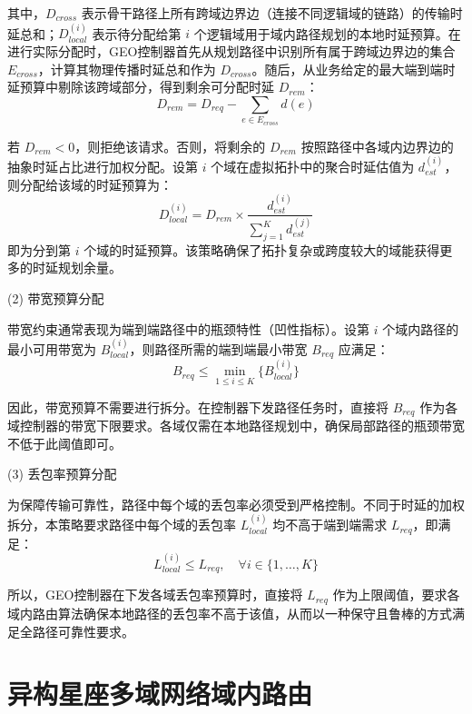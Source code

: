 \documentclass[print, master, vlined]{DissertUESTC}
\begin{document}
    其中，$D_{cross}$ 表示骨干路径上所有跨域边界边（连接不同逻辑域的链路）的传输时延总和；$D_{local}^{(i)}$ 表示待分配给第 $i$ 个逻辑域用于域内路径规划的本地时延预算。在进行实际分配时，GEO控制器首先从规划路径中识别所有属于跨域边界边的集合 $E_{cross}$，计算其物理传播时延总和作为 $D_{cross}$。随后，从业务给定的最大端到端时延预算中剔除该跨域部分，得到剩余可分配时延 $D_{rem}$：
    \begin{equation}
        D_{rem} = D_{req} - \sum_{e \in E_{cross}} d(e)
    \end{equation}
    
    若 $D_{rem} < 0$，则拒绝该请求。否则，将剩余的 $D_{rem}$ 按照路径中各域内边界边的抽象时延占比进行加权分配。设第 $i$ 个域在虚拟拓扑中的聚合时延估值为 $d_{est}^{(i)}$，则分配给该域的时延预算为：
    \begin{equation}
        D_{local}^{(i)} = D_{rem} \times \frac{d_{est}^{(i)}}{\sum_{j=1}^{K} d_{est}^{(j)}}
    \end{equation}
    即为分到第 $i$ 个域的时延预算。该策略确保了拓扑复杂或跨度较大的域能获得更多的时延规划余量。
    
    (2) 带宽预算分配
    
    带宽约束通常表现为端到端路径中的瓶颈特性（凹性指标）。设第 $i$ 个域内路径的最小可用带宽为 $B_{local}^{(i)}$，则路径所需的端到端最小带宽 $B_{req}$ 应满足：
    \begin{equation}
        B_{req} \le \min_{1 \le i \le K} \{ B_{local}^{(i)} \}
    \end{equation}
    
    因此，带宽预算不需要进行拆分。在控制器下发路径任务时，直接将 $B_{req}$ 作为各域控制器的带宽下限要求。各域仅需在本地路径规划中，确保局部路径的瓶颈带宽不低于此阈值即可。
    
    (3) 丢包率预算分配
    
    为保障传输可靠性，路径中每个域的丢包率必须受到严格控制。不同于时延的加权拆分，本策略要求路径中每个域的丢包率 $L_{local}^{(i)}$ 均不高于端到端需求 $L_{req}$，即满足：
    \begin{equation}
        L_{local}^{(i)} \le L_{req}, \quad \forall i \in \{1, \dots, K\}
    \end{equation}
    
    所以，GEO控制器在下发各域丢包率预算时，直接将 $L_{req}$ 作为上限阈值，要求各域内路由算法确保本地路径的丢包率不高于该值，从而以一种保守且鲁棒的方式满足全路径可靠性要求。

    
    \section{异构星座多域网络域内路由}
\end{document}

